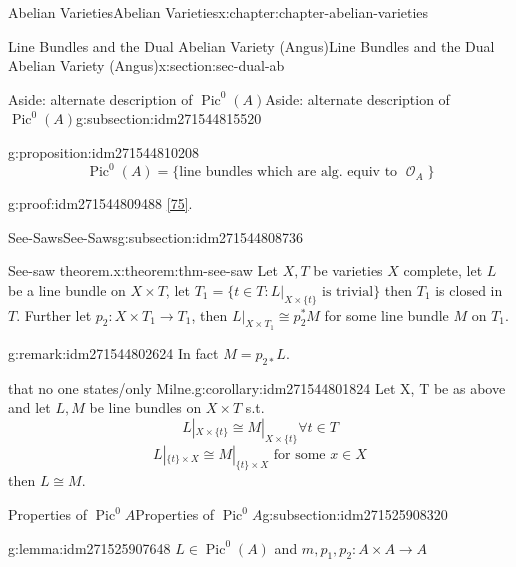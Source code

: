 \documentclass[oneside,10pt,]{book}
\numberwithin{equation}{section}
\newcommand{\sheaf}[1]{\operatorname{\mathcal{#1}}}
\DeclareMathOperator{\Pic}{Pic}
\begin{document}
\begin{chapterptx}{Abelian Varieties}{}{Abelian Varieties}{}{}{x:chapter:chapter-abelian-varieties}
\begin{sectionptx}{Line Bundles and the Dual Abelian Variety (Angus)}{}{Line Bundles and the Dual Abelian Variety (Angus)}{}{}{x:section:sec-dual-ab}
\begin{subsectionptx}{Aside: alternate description of \(\Pic^0(A)\)}{}{Aside: alternate description of \(\Pic^0(A)\)}{}{}{g:subsection:idm271544815520}
\begin{proposition}{}{}{g:proposition:idm271544810208}
%
\begin{equation*}
\Pic^0(A) = \{\text{line bundles which are alg. equiv to } \sheaf O_A\}
\end{equation*}
%
\end{proposition}
\begin{proofptx}{}{g:proof:idm271544809488}
\hyperlink{x:biblio:bib-polishchuck}{[75]}.%
\end{proofptx}
\end{subsectionptx}
%
%
\typeout{************************************************}
\typeout{************************************************}
%
\begin{subsectionptx}{See-Saws}{}{See-Saws}{}{}{g:subsection:idm271544808736}
\begin{theorem}{See-saw theorem.}{}{x:theorem:thm-see-saw}%
Let \(X,T\) be varieties      \(X\) complete, let \(L\) be a line bundle  on \(X\times T\), let \(T_1 = \{t\in T : L|_{X\times\{t\}} \text{ is trivial}\}\) then \(T_1\) is closed in \(T\). Further let \(p_2\colon X\times T_1 \to T_1\), then \(L|_{X\times T_1} \cong p^*_2 M\) for some line bundle \(M\) on \(T_1\).%
\end{theorem}
\begin{remark}{}{g:remark:idm271544802624}%
In fact \(M = p_{2*}L\).%
\end{remark}
\begin{corollary}{that no one states\slash{}only Milne.}{}{g:corollary:idm271544801824}%
Let X, T be as above and let \(L, M\) be line bundles on \(X\times T\) s.t.%
\begin{equation*}
L|_{X\times \{t\}} \cong M|_{X\times \{t\}} \forall t\in T
\end{equation*}
%
\begin{equation*}
L|_{\{t\}\times X} \cong M|_{\{t\}\times X} \text{ for some } x\in X
\end{equation*}
then \(L\cong M\).%
\end{corollary}
\end{subsectionptx}
%
%
\typeout{************************************************}
\typeout{Subsection 1.7.4 Properties of \(\Pic^0 A\)}
\typeout{************************************************}
%
\begin{subsectionptx}{Properties of \(\Pic^0 A\)}{}{Properties of \(\Pic^0 A\)}{}{}{g:subsection:idm271525908320}
\begin{lemma}{}{}{g:lemma:idm271525907648}%
\(L\in \Pic^0(A)\) and \(m,p_1,p_2\colon A\times A \to A\)%
\begin{enumerate}

\end{enumerate}
\end{lemma}
\end{subsectionptx}
\end{sectionptx}
\end{chapterptx}
\end{document}
